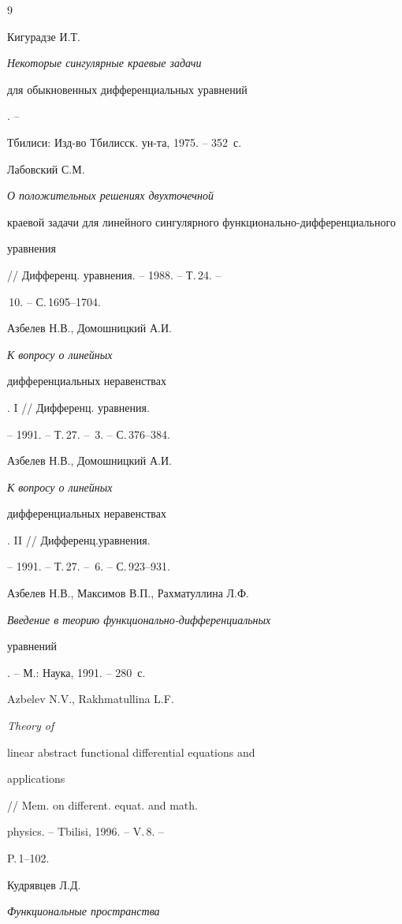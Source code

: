 \begin{thebibliography}{9}







Кигурадзе И.Т. {\em Некоторые сингулярные краевые задачи


для обыкновенных дифференциальных уравнений}. --


Тбилиси: Изд-во Тбилисск. ун-та, 1975. -- 352~с.




Лабовский С.М. {\em О положительных решениях двухточечной


краевой задачи для линейного сингулярного функционально-дифференциального


уравнения} // Дифференц. уравнения. -- 1988. -- Т.\,24. --


\No\,10. -- С.\,1695--1704.




Азбелев Н.В., Домошницкий А.И. {\em К вопросу о линейных


дифференциальных неравенствах}. I // Дифференц. уравнения.


-- 1991. -- Т.\,27. -- \No\,3. -- С.\,376--384.




Азбелев Н.В., Домошницкий А.И. {\em К вопросу о линейных


дифференциальных неравенствах}. II // Дифференц.уравнения.


-- 1991. -- Т.\,27. -- \No\,6. -- С.\,923--931.




Азбелев Н.В., Максимов В.П., Рахматуллина Л.Ф.


{\em Введение в теорию функционально-дифференциальных


уравнений}. -- М.: Наука, 1991. -- 280~с.




Azbelev N.V., Rakhmatullina L.F. {\em Theory of


linear abstract functional differential equations and


applications} // Mem. on different. equat. and math.


physics. -- Tbilisi, 1996. -- V.\,8. --


P.\,1--102.




Кудрявцев Л.Д. {\em Функциональные пространства


}
\end{thebibliography}
